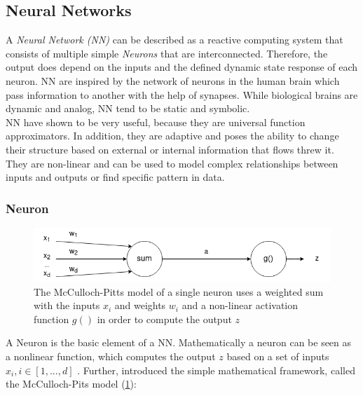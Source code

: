 

\newpage

\subsection{Neural Networks} \label{sec:NN}
A \emph{Neural Network (NN)} can be described as a reactive computing system that consists of multiple simple \emph{Neurons} that are interconnected. 
Therefore, the output does depend on the inputs and the defined dynamic state response of each neuron. 
NN are inspired by the network of neurons in the human brain which pass information to another with the help of synapses. 
While biological brains are dynamic and analog, NN tend to be static and symbolic.\\
NN have shown to be very useful, because they are universal function approximators. In addition, they are adaptive
and poses the ability to change their structure based on external or internal information that flows threw it. 
They are non-linear and can be used to model complex relationships between inputs and outputs or find specific pattern in data.

\subsubsection{Neuron}
\begin{figure}
	\centering
	\includegraphics[width=0.8 \linewidth]{figures/neuron.png}
	\caption{The McCulloch-Pitts model of a single neuron uses a weighted sum with the inputs $x_i$ and weights $w_i$ and a 
	non-linear activation function $g()$ in order to compute the output $z$ \cite{10.1063/1.1144830}}
	\label{fig:neuron}
\end{figure}
A Neuron is the basic element of a NN. 
Mathematically a neuron can be seen as a nonlinear function, 
which computes the output $z$ based on a set of inputs $x_i, i \in [1,...,d]$ \cite{10.1063/1.1144830}. 
Further, \cite{mcculloch1943logical} introduced the simple mathematical framework, called the McCulloch-Pits model (\cref{fig:neuron}):


